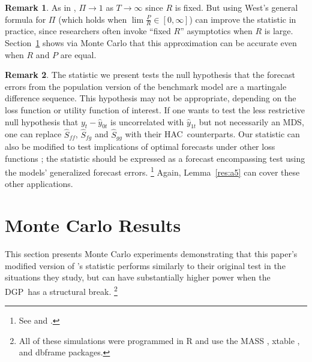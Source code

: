 \documentclass[12pt,fleqn]{article}
\newcommand\citepos[2][]{\citeauthor{#2}'s \citeyearpar[#1]{#2}}
\theoremstyle{definition}
\newtheorem{rem}{Remark}
\newcommand{\dgp}{DGP}
\newcommand{\hac}{HAC}
\newcommand{\mds}{MDS}
\begin{document}
\begin{rem}
  As in \citet{Wes:96}, $\Pi \to 1$ as $T \to \infty$ since $R$ is
  fixed.  But using West's general formula for $\Pi$ (which holds when
  $\lim \tfrac{P}{R} \in [0,\infty]$) can improve the statistic in practice,
  since researchers often invoke ``fixed $R$'' asymptotics when $R$ is
  large.  Section~\ref{sec:2} shows via Monte Carlo that this
  approximation can be accurate even when $R$ and $P$ are equal.
\end{rem}

\begin{rem}
  The statistic we present tests the null hypothesis that the forecast
  errors from the population version of the benchmark model are a
  martingale difference sequence.  This hypothesis may not be
  appropriate, depending on the loss function or utility function of
  interest.  If one wants to test the less restrictive null hypothesis that
  $y_{t} - \hat{y}_{0t}$ is uncorrelated with $\hat{y}_{1t}$ but not
  necessarily an \mds, one can replace $\hat{S}_{ff}$, $\hat{S}_{fg}$
  and $\hat{S}_{gg}$ with their \hac\ counterparts.  
  Our statistic can also be modified to test implications of
  optimal forecasts under other loss functions
  \citep[see][]{PaT:07,PaT:07b}; the statistic should be expressed as
  a forecast encompassing test using the models' generalized forecast
  errors.%
\footnote{See \citet{HLN:98} and \citet[Section~4]{ClW:07}.} %
  Again, Lemma~\ref{res:a5} can cover these other applications.
\end{rem}

\section{Monte Carlo Results}\label{sec:2}
This section presents Monte Carlo experiments demonstrating that
this paper's modified version of \citepos{ClW:07} statistic performs
similarly to their original test in the situations they study, but can
have substantially higher power when the \dgp\ has a structural
break.%
\footnote{All of these simulations were programmed in R
  \citep[version 2.14.0]{R} and use the MASS
  \citep[7.3-22]{VeR:02}, xtable \citep[version 1.6-0]{Dah:09}, and
  dbframe \citep[version 0.2.7]{Cal:10b} packages.} %
\end{document}
